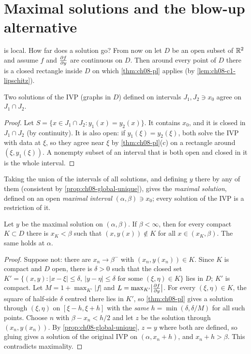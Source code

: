 \section{Maximal solutions and the blow-up alternative}\label{sec:ch08-maximal}

 is local. How far does a solution go? From now on let $D$
be an open subset of $\mathbb{R}^2$ and assume $f$ and $\frac{\partial f}{\partial y}$ are continuous on
$D$. Then around every point of $D$ there is a closed rectangle inside $D$ on
which \cref{thm:ch08-pl} applies (by \cref{lem:ch08-c1-lipschitz}).

\begin{proposition}\label{prop:ch08-global-unique}
Two solutions of the IVP (graphs in $D$) defined on intervals $J_1,J_2\ni x_0$
agree on $J_1\cap J_2$.
\end{proposition}
\begin{proof}
Let $S = \{x\in J_1\cap J_2: y_1(x) = y_2(x)\}$. It contains $x_0$, and it is
closed in $J_1\cap J_2$ (by continuity). It is also open: if $y_1(\xi) = y_2(\xi)$,
both solve the IVP with data at $\xi$, so they agree near $\xi$ by
\cref{thm:ch08-pl}(c) on a rectangle around $(\xi,y_1(\xi))$. A nonempty subset
of an interval that is both open and closed in it is the whole interval.
\end{proof}

Taking the union of the intervals of all solutions, and defining $y$ there by
any of them (consistent by \cref{prop:ch08-global-unique}), gives the
\emph{maximal solution}, defined on an open \emph{maximal interval}
$(\alpha,\beta)\ni x_0$; every solution of the IVP is a restriction of it.

\begin{theorem}\label{thm:ch08-escape}
Let $y$ be the maximal solution on $(\alpha,\beta)$. If $\beta<\infty$, then for
every compact $K\subset D$ there is $x_K<\beta$ such that $(x,y(x))\notin K$ for
all $x\in(x_K,\beta)$. The same holds at $\alpha$.
\end{theorem}
\begin{proof}
Suppose not: there are $x_n\to\beta^-$ with $(x_n,y(x_n))\in K$. Since $K$ is
compact and $D$ open, there is $\delta>0$ such that the closed set
$K' = \{(x,y): |x - \xi|\le\delta,\ |y - \eta|\le\delta \text{ for some } (\xi,\eta)\in K\}$
lies in $D$; $K'$ is compact. Let $M = 1 + \max_{K'}|f|$ and
$L = \max_{K'}\bigl|\frac{\partial f}{\partial y}\bigr|$. For every $(\xi,\eta)\in K$, the square of
half-side $\delta$ centred there lies in $K'$, so \cref{thm:ch08-pl} gives a
solution through $(\xi,\eta)$ on $[\xi - h,\xi + h]$ with the \emph{same}
$h = \min(\delta,\delta/M)$ for all such points. Choose $n$ with
$\beta - x_n<h/2$ and let $z$ be the solution through $(x_n,y(x_n))$. By
\cref{prop:ch08-global-unique}, $z = y$ where both are defined, so gluing
gives a solution of the original IVP on $(\alpha, x_n + h)$, and
$x_n + h>\beta$. This contradicts maximality.
\end{proof}

